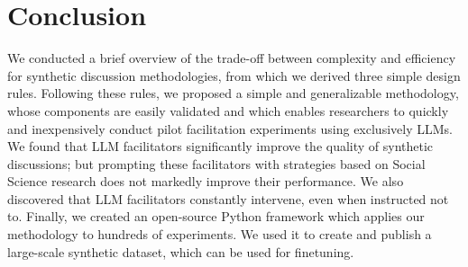 %
\section{Conclusion}

We conducted a brief overview of the trade-off between complexity and efficiency for synthetic discussion methodologies, from which we derived three simple design rules. Following these rules, we proposed a simple and generalizable methodology, whose components are easily validated and which enables researchers to quickly and inexpensively conduct pilot facilitation experiments using exclusively LLMs. We found that LLM facilitators significantly improve the quality of synthetic discussions; but prompting these facilitators with strategies based on Social Science research does not markedly improve their performance. We also discovered that LLM facilitators constantly intervene, even when instructed not to. Finally, we created an open-source Python framework which applies our methodology to hundreds of experiments. We used it to create and publish a large-scale synthetic dataset, which can be used for finetuning.